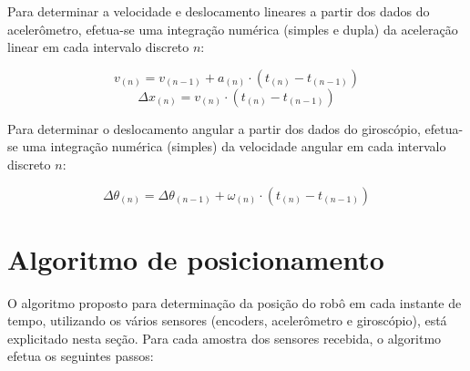 Para determinar a velocidade e deslocamento lineares a partir dos dados do acelerômetro, efetua-se uma integração numérica (simples e dupla) da aceleração linear em cada intervalo discreto $n$:

\begin{equation}
  v_{(n)} = v_{(n - 1)} + a_{(n)} \cdot (t_{(n)} - t_{(n-1)})
  \label{eq:v_acelerometro}
\end{equation}
\begin{equation}
  \Delta x_{(n)} = v_{(n)} \cdot (t_{(n)} - t_{(n-1)})
  \label{eq:x_acelerometro}
\end{equation}

Para determinar o deslocamento angular a partir dos dados do giroscópio, efetua-se uma integração numérica (simples) da velocidade angular em cada intervalo discreto $n$:

\begin{equation}
  \Delta \theta_{(n)} = \Delta \theta_{(n - 1)} + \omega_{(n)} \cdot (t_{(n)} - t_{(n-1)})
  \label{eq:theta_giroscopio}
\end{equation}


\section{Algoritmo de posicionamento}

O algoritmo proposto para determinação da posição do robô em cada instante de tempo, utilizando os vários sensores (encoders, acelerômetro e giroscópio), está explicitado nesta seção. Para cada amostra dos sensores recebida, o algoritmo efetua os seguintes passos:

